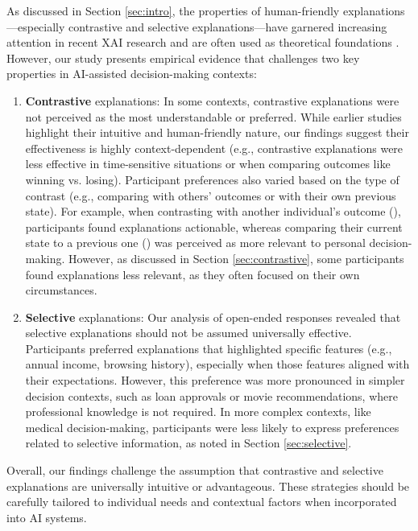As discussed in Section \ref{sec:intro}, the properties of human-friendly explanations---especially contrastive and selective explanations---have garnered increasing attention in recent XAI research and are often used as theoretical foundations \cite{SelectiveMutableDialogicXAIReview, SelectiveExplanationsLeveragingHumanInput}. However, our study presents empirical evidence that challenges two key properties in AI-assisted decision-making contexts:

\begin{enumerate}
\item {\bf Contrastive} explanations: In some contexts, contrastive explanations were not perceived as the most understandable or preferred. While earlier studies highlight their intuitive and human-friendly nature, our findings suggest their effectiveness is highly context-dependent (e.g., contrastive explanations were less effective in time-sensitive situations or when comparing outcomes like winning vs. losing). Participant preferences also varied based on the type of contrast (e.g., comparing with others' outcomes or with their own previous state). For example, when contrasting with another individual's outcome (\cto), participants found explanations actionable, whereas comparing their current state to a previous one (\ctt) was perceived as more relevant to personal decision-making. However, as discussed in Section \ref{sec:contrastive}, some participants found \cto explanations less relevant, as they often focused on their own circumstances.
\item {\bf Selective} explanations: Our analysis of open-ended responses revealed that selective explanations should not be assumed universally effective. Participants preferred explanations that highlighted specific features (e.g., annual income, browsing history), especially when those features aligned with their expectations. However, this preference was more pronounced in simpler decision contexts, such as loan approvals or movie recommendations, where professional knowledge is not required. In more complex contexts, like medical decision-making, participants were less likely to express preferences related to selective information, as noted in Section \ref{sec:selective}.
\end{enumerate}

Overall, our findings challenge the assumption that contrastive and selective explanations are universally intuitive or advantageous. These strategies should be carefully tailored to individual needs and contextual factors when incorporated into AI systems.



